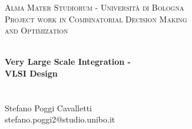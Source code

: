 
\begin{titlepage}
\vbox{ }
\vbox{ }
\begin{center}
\textsc{\LARGE Alma Mater Studiorum - Università di Bologna}\\[1.5cm]
\textsc{\Large Project work in Combinatorial Decision Making \\ and Optimization}\\[0.5cm]
\vbox{ }

\vfill
\HRule \\[0.4cm]
{ \huge \bfseries Very Large Scale Integration - \\ VLSI Design}\\[0.4cm]
\HRule \\[1.5cm]

\vfill
\large
\emph \\
Stefano Poggi Cavalletti
\\
stefano.poggi2@studio.unibo.it
\vfill

\end{center}
\end{titlepage}
